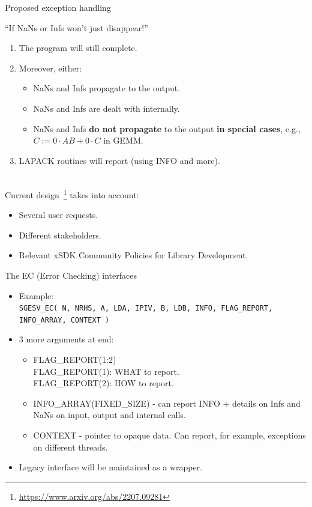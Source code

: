 \documentclass[11pt]{beamer}
\begin{document}
\begin{frame}{Proposed exception handling}

	``If NaNs or Infs won't just disappear!''
	\begin{enumerate}
		\item The program will still complete.
		\item Moreover, either:
		\begin{itemize}
			\item NaNs and Infs propagate to the output.
			\item NaNs and Infs are dealt with internally.
			\item NaNs and Infs \textbf{do not propagate} to the output \textbf{in special cases}, e.g., $C := 0\cdot AB+0\cdot C$ in GEMM.
		\end{itemize}
		\item LAPACK routines will report (using INFO and more).
	\end{enumerate}

	~\\
	Current design~\footnote{\url{https://www.arxiv.org/abs/2207.09281}} takes into account:
	\begin{itemize}
		\item Several user requests.
		\item Different stakeholders.
		\item Relevant xSDK Community Policies for Library Development.
	\end{itemize}

\end{frame}

\begin{frame}{The EC (Error Checking) interfaces}

	\begin{itemize}
		\setlength\itemsep{1em}
		\item Example:
		~\\
		\texttt{SGESV\_EC( N, NRHS, A, LDA, IPIV, B, LDB, INFO, FLAG\_REPORT, INFO\_ARRAY, CONTEXT )}
		\item 3 more arguments at end:
		\begin{itemize}
			\setlength\itemsep{1em}
			\item FLAG\_REPORT(1:2)\\
			FLAG\_REPORT(1): WHAT to report.\\
			FLAG\_REPORT(2): HOW to report.
			\item INFO\_ARRAY(FIXED\_SIZE) - can report INFO + details on Infs and NaNs on input, output and internal calls.
			\item CONTEXT - pointer to opaque data. Can report, for example, exceptions on different threads.
		\end{itemize}
		\item Legacy interface will be maintained as a wrapper.
	\end{itemize}

\end{frame}
\end{document}

